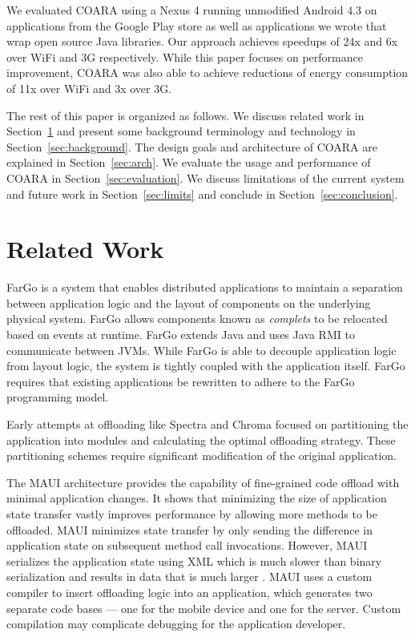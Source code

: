\documentclass[10pt,journal,cspaper,compsoc]{IEEEtran}
\begin{document}
We evaluated COARA using a Nexus 4 running unmodified Android 4.3 on applications from the Google Play store as well as applications we wrote that wrap open source Java libraries. Our approach achieves speedups of 24x and 6x over WiFi and 3G respectively. While this paper focuses on performance improvement, COARA was also able to achieve reductions of energy consumption of 11x over WiFi and 3x over 3G.

The rest of this paper is organized as follows.
We discuss related work in Section~\ref{sec:related} and present some background terminology and technology in Section~\ref{sec:background}.
The design goals and architecture of COARA are explained in Section~\ref{sec:arch}.
We evaluate the usage and performance of COARA in Section~\ref{sec:evaluation}.
We discuss limitations of the current system and future work in Section~\ref{sec:limits} and conclude in Section~\ref{sec:conclusion}.



\section{Related Work}
\label{sec:related}
FarGo \cite{Holder:1999wj} is a system that enables distributed applications to maintain a separation between application logic and the layout of components on the underlying physical system. FarGo allows components known as \emph{complets} to be relocated based on events at runtime.  FarGo extends Java and uses Java RMI to communicate between JVMs.  While FarGo is able to decouple application logic from layout logic, the system is tightly coupled with the application itself.  FarGo requires that existing applications be rewritten to adhere to the FarGo programming model.

Early attempts at offloading like Spectra \cite{Flinn:2001wh} and Chroma \cite{Balan:2003uz} focused on partitioning the application into modules and calculating the optimal offloading strategy.  These partitioning schemes require significant modification of the original application.

The MAUI \cite{Cuervo:2010:MMS:1814433.1814441} architecture provides the capability of fine-grained code offload with minimal application changes.  It shows that minimizing the size of application state transfer vastly improves performance by allowing more methods to be offloaded.  MAUI minimizes state transfer by only sending the difference in application state on subsequent method call invocations. However, MAUI serializes the application state using XML which is much slower than binary serialization and results in data that is much larger \cite{Hericko:2003tk}.  MAUI uses a custom compiler to insert offloading logic into an application, which generates two separate code bases --- one for the mobile device and one for the server.  Custom compilation may complicate debugging for the application developer.
\end{document}
